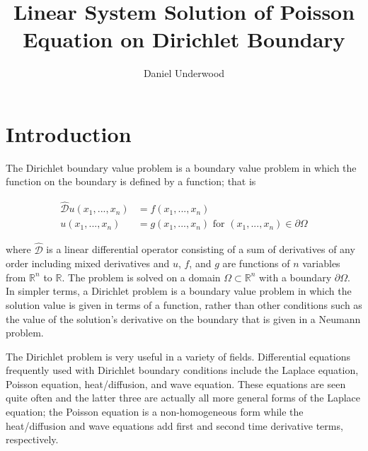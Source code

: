\documentclass[10pt,a4paper]{article}
\author{Daniel Underwood}
\title{Linear System Solution of Poisson Equation on Dirichlet Boundary}
\begin{document}
\maketitle



\section*{Introduction}
The Dirichlet boundary value problem is a boundary value problem in which the function on the boundary is defined by a function; that is

\begin{subequations}
  \begin{align}
  \hat{\mathcal{D}} u(x_1 , ... , x_n) &= f(x_1 , ... , x_n) \label{eqn: dirichlet 1}\\
  u(x_1, ..., x_n) &= g(x_1, ..., x_n) \,\, \text{for} \,\, (x_1, ..., x_n) \in \partial\Omega \label{eqn: dirichlet 2}
  \end{align}
\end{subequations}

where $\hat{\mathcal{D}}$ is a linear differential operator consisting of a sum of derivatives of any order including mixed derivatives and $u$, $f$, and $g$ are functions of $n$ variables from $\mathbb{R}^n$ to $\mathbb{R}$. The problem is solved on a domain $\Omega \subset \mathbb{R}^n$ with a boundary $\partial \Omega$. In simpler terms, a Dirichlet problem is a boundary value problem in which the solution value is given in terms of a function, rather than other conditions such as the value of the solution's derivative on the boundary that is given in a Neumann problem.

The Dirichlet problem is very useful in a variety of fields. Differential equations frequently used with Dirichlet boundary conditions include the  Laplace equation, Poisson equation, heat/diffusion, and wave equation. These equations are seen quite often and the latter three are actually all more general forms of the Laplace equation; the Poisson equation is a non-homogeneous form while the heat/diffusion and wave equations add first and second time derivative terms, respectively.
\end{document}

